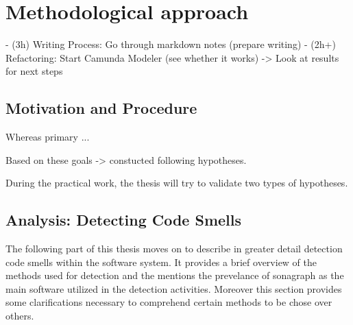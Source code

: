 \chapter{Methodological approach}
- (3h) Writing Process: Go through markdown notes (prepare writing)
- (2h+) Refactoring: Start Camunda Modeler (see whether it works)
	-> Look at results for next steps


\section{Motivation and Procedure}
% 
% 

%
%





Whereas primary ...





Based on these goals -> constucted following hypotheses.

During the practical work, 
	the thesis will try to validate two types of hypotheses.



\section{Analysis: Detecting Code Smells}

The following part of this thesis moves on to describe in greater detail detection code smells within the software system. It provides a brief overview of the methods used for detection and the mentions the prevelance of sonagraph as the main software utilized in the detection activities. Moreover this section provides some clarifications necessary to comprehend certain methods to be chose over others.

